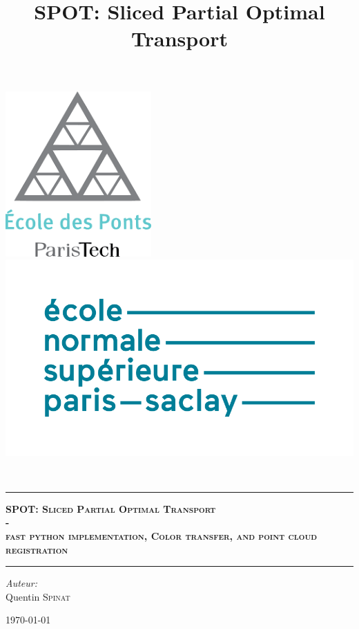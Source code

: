 \documentclass[a4paper,12pt]{article}
\title{SPOT: Sliced Partial Optimal Transport}
\begin{document}

\begin{titlepage}
\begin{center}

\includegraphics[scale=0.7]{ENPC.png}
\includegraphics[scale=0.25]{ENS.png}

\textsc{\Large }\\[1cm]

\rule[5pt]{\linewidth}{.7pt}

{\huge \bfseries \textsc{SPOT: Sliced Partial Optimal Transport  \\-\\ fast python implementation, Color transfer, and point cloud registration\\[0.4cm] }}

\rule[5pt]{\linewidth}{.7pt}

\emph{Auteur:}\\
Quentin \textsc{Spinat}


\vfill

{\large \today}

\end{center}
\end{titlepage}
\end{document}
